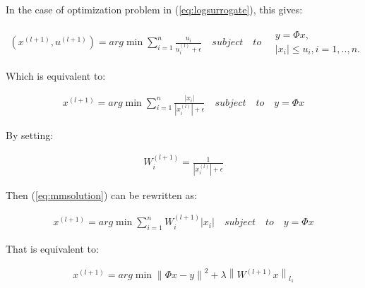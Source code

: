 In the case of optimization problem in (\ref{eq:logsurrogate}), this gives:

\begin{equation}
\begin{gathered}
\left ( x^{\left ( l+1 \right )}, u^{\left ( l+1 \right )} \right ) =
arg \min \sum_{i=1}^{n}\frac{u_{i}}{u_{i}^{\left ( l \right )}+\epsilon }
\quad subject \quad to \quad \begin{matrix}
y=\Phi x,\\
\left | x_{i} \right | \leq u_{i}, i=1,..,n.
\end{matrix}
\end{gathered}
\end{equation}

Which is equivalent to:

\begin{equation}
\label{eq:mmsolution}
\begin{gathered}
 x^{\left ( l+1 \right )} = arg \min \sum_{i=1}^{n} \frac{\left | x_{i} \right |}{\left | x_{i}^{\left ( l \right )} \right |+\epsilon }
\quad subject \quad to \quad y=\Phi x
\end{gathered}
\end{equation}

By setting:

\begin{equation}
\begin{gathered}
W_{i}^{\left ( l+1 \right )}  = \frac{1}{\left | x_{i}^{\left ( l \right )} \right |+\epsilon }
\end{gathered}
\end{equation}

Then (\ref{eq:mmsolution}) can be rewritten as:

\begin{equation}
\begin{gathered}
x^{\left ( l+1 \right )} = arg \min \sum_{i=1}^{n} W_{i}^{\left ( l+1 \right )} \left | x_{i} \right |
\quad subject \quad to \quad y=\Phi x
\end{gathered}
\end{equation}

That is equivalent to:

\begin{equation}
\begin{gathered}
x^{\left ( l+1 \right )} = arg \min \left \| \Phi x-y \right \|^{2} + \lambda \left \| W^{\left ( l+1 \right )} x \right \|_{l_{1}}
\end{gathered}
\end{equation}


